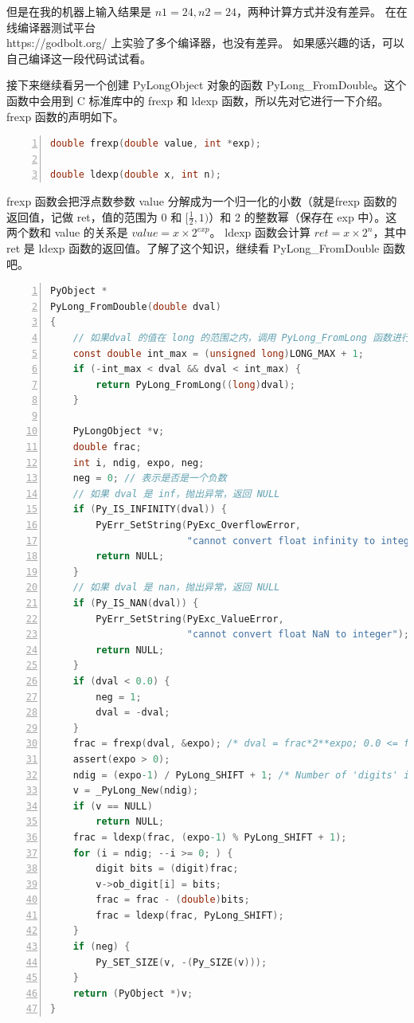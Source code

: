但是在我的机器上输入结果是 $n1=24, n2=24$，两种计算方式并没有差异。
在在线编译器测试平台\\
 https://godbolt.org/ 上实验了多个编译器，也没有差异。
如果感兴趣的话，可以自己编译这一段代码试试看。

接下来继续看另一个创建 PyLongObject 对象的函数 PyLong\_FromDouble。这个函数中会用到 C
标准库中的 frexp 和 ldexp 函数，所以先对它进行一下介绍。frexp 函数的声明如下。

\begin{lstlisting}[language=C, numbers=left, numbersep=1em, numberstyle=\footnotesize , breaklines=true]
double frexp(double value, int *exp);

double ldexp(double x, int n);
\end{lstlisting}

frexp 函数会把浮点数参数 value 分解成为一个归一化的小数（就是frexp 函数的返回值，记做 ret，值的范围为 0 
和 $[\frac{1}{2}, 1)$）和 2 的整数幂（保存在 exp 中）。这两个数和 value 的关系是 $value = x \times 2^{exp} $。
ldexp 函数会计算 $ret = x \times 2^{n}$，其中 ret 是 ldexp 函数的返回值。了解了这个知识，继续看
PyLong\_FromDouble 函数吧。

\begin{lstlisting}[language=C, numbers=left, numbersep=1em, numberstyle=\footnotesize , breaklines=true]
PyObject *
PyLong_FromDouble(double dval)
{
    // 如果dval 的值在 long 的范围之内，调用 PyLong_FromLong 函数进行构造
    const double int_max = (unsigned long)LONG_MAX + 1;
    if (-int_max < dval && dval < int_max) {
        return PyLong_FromLong((long)dval);
    }

    PyLongObject *v;
    double frac;
    int i, ndig, expo, neg;
    neg = 0; // 表示是否是一个负数
    // 如果 dval 是 inf，抛出异常，返回 NULL
    if (Py_IS_INFINITY(dval)) {
        PyErr_SetString(PyExc_OverflowError,
                        "cannot convert float infinity to integer");
        return NULL;
    }
    // 如果 dval 是 nan，抛出异常，返回 NULL
    if (Py_IS_NAN(dval)) {
        PyErr_SetString(PyExc_ValueError,
                        "cannot convert float NaN to integer");
        return NULL;
    }
    if (dval < 0.0) {
        neg = 1;
        dval = -dval;
    }
    frac = frexp(dval, &expo); /* dval = frac*2**expo; 0.0 <= frac < 1.0 */
    assert(expo > 0);
    ndig = (expo-1) / PyLong_SHIFT + 1; /* Number of 'digits' in result */
    v = _PyLong_New(ndig);
    if (v == NULL)
        return NULL;
    frac = ldexp(frac, (expo-1) % PyLong_SHIFT + 1);
    for (i = ndig; --i >= 0; ) {
        digit bits = (digit)frac;
        v->ob_digit[i] = bits;
        frac = frac - (double)bits;
        frac = ldexp(frac, PyLong_SHIFT);
    }
    if (neg) {
        Py_SET_SIZE(v, -(Py_SIZE(v)));
    }
    return (PyObject *)v;
}
\end{lstlisting}

